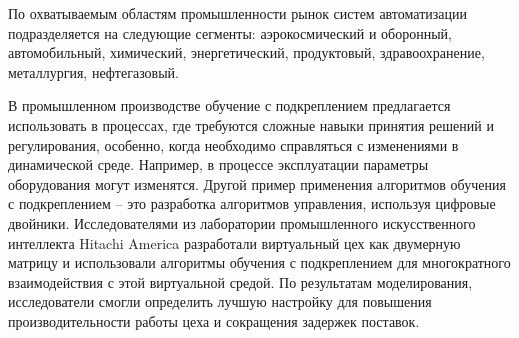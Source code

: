 По охватываемым областям промышленности рынок систем автоматизации подразделяется на следующие сегменты: аэрокосмический и оборонный, автомобильный, химический, энергетический, продуктовый, здравоохранение, металлургия, нефтегазовый.

В промышленном производстве обучение с подкреплением предлагается использовать в процессах, где требуются сложные навыки принятия решений и регулирования, особенно, когда необходимо справляться с изменениями в динамической среде. Например, в процессе эксплуатации параметры оборудования могут изменятся. Другой пример применения алгоритмов обучения с подкреплением -- это разработка алгоритмов управления, используя цифровые двойники. Исследователями из лаборатории промышленного искусственного интеллекта Hitachi America разработали виртуальный цех как двумерную матрицу и использовали алгоритмы обучения с подкреплением для многократного взаимодействия с этой виртуальной средой. По результатам моделирования, исследователи смогли определить лучшую настройку для повышения производительности работы цеха и сокращения задержек поставок.




